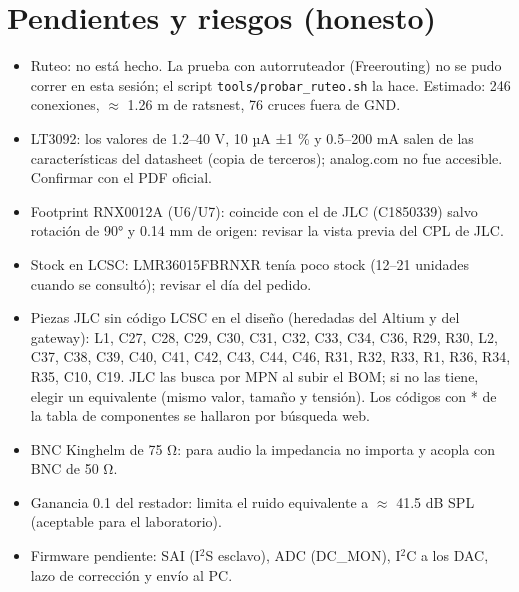 \documentclass[10pt,a4paper]{article}
\begin{document}
\section{Pendientes y riesgos (honesto)}
\begin{itemize}
\item Ruteo: no está hecho. La prueba con autorruteador (Freerouting) no se pudo correr en esta sesión; el script \texttt{tools/probar\_ruteo.sh} la hace. Estimado: 246 conexiones, \ensuremath{\approx} 1.26 m de ratsnest, 76 cruces fuera de GND.
\item LT3092: los valores de 1.2–40 V, 10 µA ±1 \% y 0.5–200 mA salen de las características del datasheet (copia de terceros); analog.com no fue accesible. Confirmar con el PDF oficial.
\item Footprint RNX0012A (U6/U7): coincide con el de JLC (C1850339) salvo rotación de 90° y 0.14 mm de origen: revisar la vista previa del CPL de JLC.
\item Stock en LCSC: LMR36015FBRNXR tenía poco stock (12–21 unidades cuando se consultó); revisar el día del pedido.
\item Piezas JLC sin código LCSC en el diseño (heredadas del Altium y del gateway): L1, C27, C28, C29, C30, C31, C32, C33, C34, C36, R29, R30, L2, C37, C38, C39, C40, C41, C42, C43, C44, C46, R31, R32, R33, R1, R36, R34, R35, C10, C19. JLC las busca por MPN al subir el BOM; si no las tiene, elegir un equivalente (mismo valor, tamaño y tensión). Los códigos con * de la tabla de componentes se hallaron por búsqueda web.
\item BNC Kinghelm de 75 Ω: para audio la impedancia no importa y acopla con BNC de 50 Ω.
\item Ganancia 0.1 del restador: limita el ruido equivalente a \ensuremath{\approx} 41.5 dB SPL (aceptable para el laboratorio).
\item Firmware pendiente: SAI (I$^2$S esclavo), ADC (DC\_MON), I$^2$C a los DAC, lazo de corrección y envío al PC.
\end{itemize}
\end{document}
